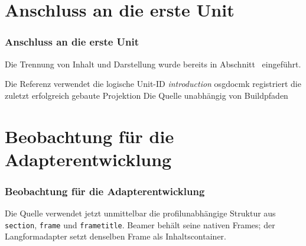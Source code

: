 \documentclass{osglecture}
\begin{document}

\section{Anschluss an die erste Unit}
\begin{frame}
  \frametitle{Anschluss an die erste Unit}
  Die Trennung von Inhalt und Darstellung wurde bereits in
  Abschnitt~ eingeführt.

  \begin{presitemize}
    \item Die Referenz verwendet die logische Unit-ID \emph{introduction}
    \anditem osgdocmk registriert die zuletzt erfolgreich gebaute Projektion
    \thereforeitem Die Quelle  unabhängig von Buildpfaden
  \end{presitemize}
\end{frame}

\section{Beobachtung für die Adapterentwicklung}
\begin{frame}
  \frametitle{Beobachtung für die Adapterentwicklung}
  Die Quelle verwendet jetzt unmittelbar die profilunabhängige Struktur aus
  \texttt{section}, \texttt{frame} und \texttt{frametitle}. Beamer behält
  seine nativen Frames; der Langformadapter setzt denselben Frame als
  Inhaltscontainer.
\end{frame}
\end{document}
